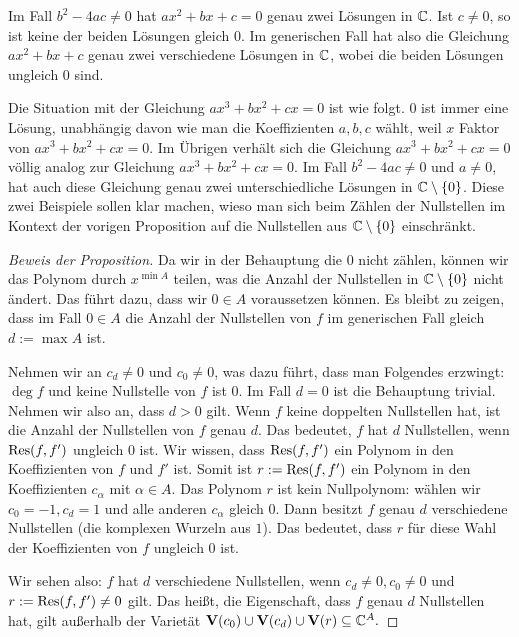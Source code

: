 \documentclass[11pt]{article}
\numberwithin{equation}{section}
\begin{document}
Im Fall $b^2 - 4 a c \ne 0$ hat $ax^2 + b x + c =0$ genau zwei Lösungen in $\mathbb{C}$. Ist $c \ne 0$, so ist keine der beiden Lösungen gleich $0$. Im generischen Fall hat also die Gleichung $a x^2 + b x + c$ genau zwei verschiedene Lösungen in $\mathbb{C}$, wobei die beiden Lösungen ungleich $0$ sind. 

Die Situation mit der Gleichung $a x^3 + b x^2 + c x = 0$ ist wie folgt. $0$ ist immer eine Lösung, unabhängig davon wie man die Koeffizienten $a,b,c$ wählt, weil $x$ Faktor von $a x^3 + b x^2 + cx =0$. Im Übrigen verhält sich die Gleichung $a x^3 + b x^2 + c x =0$ völlig analog zur Gleichung $a x^3 + b x^2+ cx =0$. Im Fall $b^2 - 4 a c \ne 0$ und $a \ne 0$, hat auch diese Gleichung genau zwei unterschiedliche Lösungen in $\mathbb{C} \setminus \{0\}$. Diese zwei Beispiele sollen klar machen, wieso man sich beim Zählen der Nullstellen im Kontext der vorigen Proposition auf die Nullstellen aus $\mathbb{C} \setminus \{0\}$ einschränkt. 


\begin{proof}[Beweis der Proposition] 
	Da wir in der Behauptung die $0$ nicht zählen, können wir das Polynom durch $x^{\min A}$ teilen, was die Anzahl der Nullstellen in $\mathbb{C} \setminus \{0\}$ nicht ändert. Das führt dazu, dass wir $0 \in A$ voraussetzen können. Es bleibt zu zeigen, dass im Fall $0 \in A$ die Anzahl der Nullstellen von $f$ im generischen Fall gleich $d:= \max A$ ist. 
	
	Nehmen wir an $c_d \ne 0$ und $c_0 \ne 0$, was dazu führt, dass man Folgendes erzwingt: $\deg f$ und keine Nullstelle von $f$ ist $0$. Im Fall $d=0$ ist die Behauptung trivial. Nehmen wir also an, dass $d>0$ gilt. 
	Wenn $f$ keine doppelten Nullstellen hat, ist die Anzahl der Nullstellen von $f$ genau $d$. Das bedeutet, $f$ hat $d$ Nullstellen, wenn $\operatorname{Res}(f,f')$ ungleich $0$ ist. Wir wissen, dass $\operatorname{Res}(f,f')$ ein Polynom in den Koeffizienten von $f$ und $f'$ ist. Somit ist $r:=\operatorname{Res}(f,f')$ ein Polynom in den Koeffizienten $c_\alpha$ mit $\alpha \in A$. Das Polynom $r$ ist kein Nullpolynom: wählen wir $c_0=-1, c_d=1$ und alle anderen $c_\alpha$ gleich $0$. Dann besitzt $f$ genau $d$ verschiedene Nullstellen (die komplexen Wurzeln aus $1$). Das bedeutet, dass $r$ für diese Wahl der Koeffizienten von $f$ ungleich $0$ ist. 
	
	Wir sehen also: $f$ hat $d$ verschiedene Nullstellen, wenn $c_d \ne 0, c_0 \ne 0$ und $r:=\operatorname{Res}(f,f') \ne 0$ gilt. Das heißt, die Eigenschaft, dass $f$ genau $d$ Nullstellen hat, gilt außerhalb der Varietät $\mathbf{V}(c_0) \cup \mathbf{V}(c_d) \cup \mathbf{V}(r) \subseteq \mathbb{C}^A.$ 
\end{proof} 
\end{document}
